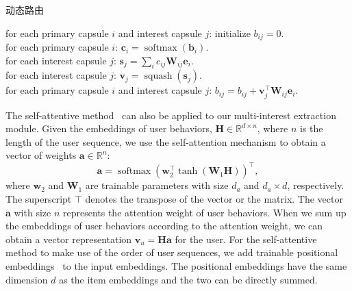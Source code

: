 

\begin{algorithm}[t]
	\caption{动态路由 \label{algo:dynamic_routing}}
	for each primary capsule $i$ and interest capsule $j$: initialize $b_{ij} = 0$. \\
     {
        for each primary capsule $i$: $\mathbf{c}_i = \operatorname{softmax}(\mathbf{b}_{i})$.\\
        for each interest capsule $j$: $\mathbf{s}_j = \sum_{i} c_{ij}\mathbf{W}_{ij}\mathbf{e}_i$.\\%

        for each interest capsule $j$: $\mathbf{v}_j = \operatorname{squash}(\mathbf{s}_j)$. \\

        for each primary capsule $i$ and interest capsule $j$: $b_{ij} = b_{ij}+ \mathbf{v}_j^\top \mathbf{W}_{ij}\mathbf{e}_i$.
    }
\end{algorithm}


The self-attentive method~\cite{lin2017structured} can also be applied to our multi-interest extraction module. 
Given the embeddings of user behaviors, $\mathbf{H}\in \mathbb{R}^{d\times n}$, where $n$ is the length of the user sequence, we use the self-attention mechanism to obtain a vector of weights $\mathbf{a} \in \mathbb{R}^{n}$:
\begin{equation}
    \mathbf{a} = \operatorname{softmax}(\mathbf{w}_{2}^\top \operatorname{tanh}(\mathbf{W}_{1} \mathbf{H}))^\top,
\end{equation}
\noindent where $\mathbf{w}_{2}$ and $\mathbf{W}_{1}$ are trainable parameters with size $d_a$ and $d_a \times d$, respectively. The superscript $\top$ denotes the transpose of the vector or the matrix. The vector $\mathbf{a}$ with size $n$ represents the attention weight of user behaviors. When we sum up the embeddings of user behaviors according to the attention weight, we can obtain a vector representation $\mathbf{v}_u = \mathbf{H} \mathbf{a}$ for the user. For the self-attentive method to make use of the order of user sequences, we add trainable positional embeddings~\cite{vaswani2017attention} to the input embeddings. The positional embeddings have the same dimension $d$ as the item embeddings and the two can be directly summed. 

